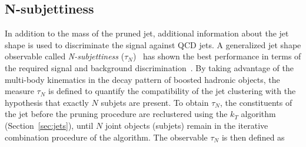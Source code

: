 

\subsection{N-subjettiness}
\label{subsec:nsubj}

In addition to the mass of the pruned jet, additional information about the jet shape is used to discriminate the signal against QCD jets.
A generalized jet shape observable called \emph{N-subjettiness} ($\tau_N$)~\cite{Thaler:2010tr} has shown the best performance in terms of the required signal and background discrimination~\cite{Khachatryan:2014vla}.
By taking advantage of the multi-body kinematics in the decay pattern of boosted hadronic objects, the measure $\tau_N$ is defined to quantify the compatibility of the jet clustering with the hypothesis that exactly $N$ subjets are present.
To obtain $\tau_N$, the constituents of the jet before the pruning procedure are reclustered using the $k_T$ algorithm (Section~\ref{sec:jets}), until $N$ joint objects (subjets) remain in the iterative combination procedure of the algorithm. The observable $\tau_N$ is then defined as


